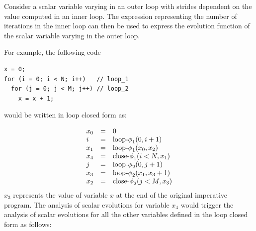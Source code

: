 Consider a scalar variable varying in an outer loop with strides
dependent on the value computed in an inner loop.  The expression
representing the number of iterations in the inner loop can then be
used to express the evolution function of the scalar variable varying
in the outer loop.

For example, the following code
\begin{verbatim}
x = 0;
for (i = 0; i < N; i++)   // loop_1
  for (j = 0; j < M; j++) // loop_2
    x = x + 1;
\end{verbatim}
would be written in loop closed \SSA{} form as:

\[
\begin{array}{lcl}
  x_0 &=& 0\\
  i &=& \textrm{loop-$\phi$}_1 (0, i + 1)\\
  x_1 &=& \textrm{loop-$\phi$}_1 (x_0, x_2)\\
  x_4 &=& \textrm{close-$\phi$}_1 (i < N, x_1)\\
  j &=& \textrm{loop-$\phi$}_2 (0, j + 1)\\
  x_3 &=& \textrm{loop-$\phi$}_2 (x_1, x_3 + 1)\\
  x_2 &=& \textrm{close-$\phi$}_2 (j < M, x_3)\\
\end{array}
\]
$x_3$ represents the value of variable $x$ at the end of the
original imperative program.  The analysis of scalar evolutions for
variable $x_4$ would trigger the analysis of scalar evolutions for all
the other variables defined in the loop closed \SSA{} form as follows:
